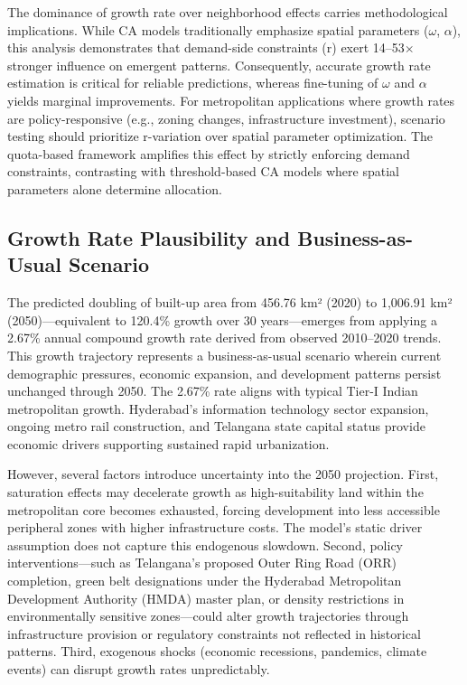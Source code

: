 \documentclass[12pt,a4paper]{article}
\begin{document}
The dominance of growth rate over neighborhood effects carries methodological implications. While CA models traditionally emphasize spatial parameters ($\omega$, $\alpha$), this analysis demonstrates that demand-side constraints (r) exert 14--53$\times$ stronger influence on emergent patterns. Consequently, accurate growth rate estimation is critical for reliable predictions, whereas fine-tuning of $\omega$ and $\alpha$ yields marginal improvements. For metropolitan applications where growth rates are policy-responsive (e.g., zoning changes, infrastructure investment), scenario testing should prioritize r-variation over spatial parameter optimization. The quota-based framework amplifies this effect by strictly enforcing demand constraints, contrasting with threshold-based CA models where spatial parameters alone determine allocation.

\subsection{Growth Rate Plausibility and Business-as-Usual Scenario}

The predicted doubling of built-up area from 456.76 km² (2020) to 1,006.91 km² (2050)—equivalent to 120.4\% growth over 30 years—emerges from applying a 2.67\% annual compound growth rate derived from observed 2010--2020 trends. This growth trajectory represents a business-as-usual scenario wherein current demographic pressures, economic expansion, and development patterns persist unchanged through 2050. The 2.67\% rate aligns with typical Tier-I Indian metropolitan growth.  Hyderabad's information technology sector expansion, ongoing metro rail construction, and Telangana state capital status provide economic drivers supporting sustained rapid urbanization.

However, several factors introduce uncertainty into the 2050 projection. First, saturation effects may decelerate growth as high-suitability land within the metropolitan core becomes exhausted, forcing development into less accessible peripheral zones with higher infrastructure costs. The model's static driver assumption does not capture this endogenous slowdown. Second, policy interventions—such as Telangana's proposed Outer Ring Road (ORR) completion, green belt designations under the Hyderabad Metropolitan Development Authority (HMDA) master plan, or density restrictions in environmentally sensitive zones—could alter growth trajectories through infrastructure provision or regulatory constraints not reflected in historical patterns. Third, exogenous shocks (economic recessions, pandemics, climate events) can disrupt growth rates unpredictably.
\end{document}
